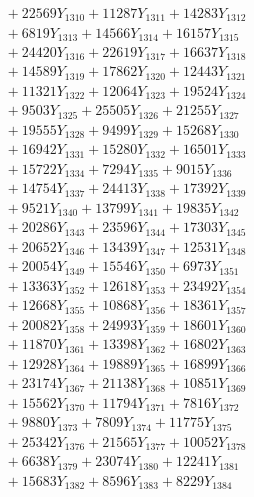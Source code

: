 \documentclass[a4paper,10pt]{article}
\begin{document}
{\begin{align}
&\;  + 22569 Y_{1310} + 11287 Y_{1311} + 14283 Y_{1312} \\[0.3ex]
&\;  + 6819 Y_{1313} + 14566 Y_{1314} + 16157 Y_{1315} \\[0.3ex]
&\;  + 24420 Y_{1316} + 22619 Y_{1317} + 16637 Y_{1318} \\[0.5ex]\allowbreak
&\;  + 14589 Y_{1319} + 17862 Y_{1320} + 12443 Y_{1321} \\[0.3ex]
&\;  + 11321 Y_{1322} + 12064 Y_{1323} + 19524 Y_{1324} \\[0.3ex]
&\;  + 9503 Y_{1325} + 25505 Y_{1326} + 21255 Y_{1327} \\[0.3ex]
&\;  + 19555 Y_{1328} + 9499 Y_{1329} + 15268 Y_{1330} \\[0.3ex]
&\;  + 16942 Y_{1331} + 15280 Y_{1332} + 16501 Y_{1333} \\[0.3ex]
&\;  + 15722 Y_{1334} + 7294 Y_{1335} + 9015 Y_{1336} \\[0.3ex]
&\;  + 14754 Y_{1337} + 24413 Y_{1338} + 17392 Y_{1339} \\[0.3ex]
&\;  + 9521 Y_{1340} + 13799 Y_{1341} + 19835 Y_{1342} \\[0.3ex]
&\;  + 20286 Y_{1343} + 23596 Y_{1344} + 17303 Y_{1345} \\[0.3ex]
&\;  + 20652 Y_{1346} + 13439 Y_{1347} + 12531 Y_{1348} \\[0.5ex]\allowbreak
&\;  + 20054 Y_{1349} + 15546 Y_{1350} + 6973 Y_{1351} \\[0.3ex]
&\;  + 13363 Y_{1352} + 12618 Y_{1353} + 23492 Y_{1354} \\[0.3ex]
&\;  + 12668 Y_{1355} + 10868 Y_{1356} + 18361 Y_{1357} \\[0.3ex]
&\;  + 20082 Y_{1358} + 24993 Y_{1359} + 18601 Y_{1360} \\[0.3ex]
&\;  + 11870 Y_{1361} + 13398 Y_{1362} + 16802 Y_{1363} \\[0.3ex]
&\;  + 12928 Y_{1364} + 19889 Y_{1365} + 16899 Y_{1366} \\[0.3ex]
&\;  + 23174 Y_{1367} + 21138 Y_{1368} + 10851 Y_{1369} \\[0.3ex]
&\;  + 15562 Y_{1370} + 11794 Y_{1371} + 7816 Y_{1372} \\[0.3ex]
&\;  + 9880 Y_{1373} + 7809 Y_{1374} + 11775 Y_{1375} \\[0.3ex]
&\;  + 25342 Y_{1376} + 21565 Y_{1377} + 10052 Y_{1378} \\[0.5ex]\allowbreak
&\;  + 6638 Y_{1379} + 23074 Y_{1380} + 12241 Y_{1381} \\[0.3ex]
&\;  + 15683 Y_{1382} + 8596 Y_{1383} + 8229 Y_{1384} \\[0.3ex]

\end{align}}
\end{document}
